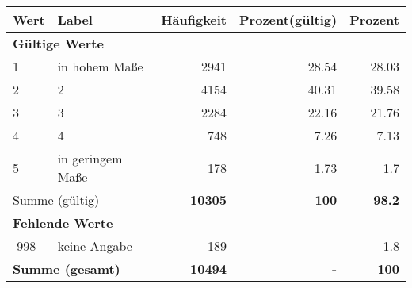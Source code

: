      \begin{longtable}{lXrrr}
     \toprule
     \textbf{Wert} & \textbf{Label} & \textbf{Häufigkeit} & \textbf{Prozent(gültig)} & \textbf{Prozent} \\
     \endhead
     \midrule
     \multicolumn{5}{l}{\textbf{Gültige Werte}}\\

     1 &
     \multicolumn{1}{X}{ in hohem Maße   } &


       \num{2941} &
       \num[round-mode=places,round-precision=2]{28.54} &
         \num[round-mode=places,round-precision=2]{28.03} \\

     2 &
     \multicolumn{1}{X}{ 2   } &


       \num{4154} &
       \num[round-mode=places,round-precision=2]{40.31} &
         \num[round-mode=places,round-precision=2]{39.58} \\

     3 &
     \multicolumn{1}{X}{ 3   } &


       \num{2284} &
       \num[round-mode=places,round-precision=2]{22.16} &
         \num[round-mode=places,round-precision=2]{21.76} \\

     4 &
     \multicolumn{1}{X}{ 4   } &


       \num{748} &
       \num[round-mode=places,round-precision=2]{7.26} &
         \num[round-mode=places,round-precision=2]{7.13} \\

     5 &
     \multicolumn{1}{X}{ in geringem Maße   } &


       \num{178} &
       \num[round-mode=places,round-precision=2]{1.73} &
         \num[round-mode=places,round-precision=2]{1.7} \\
     \midrule
     \multicolumn{2}{l}{Summe (gültig)} &
       \textbf{\num{10305}} &
     \textbf{\num{100}} &
       \textbf{\num[round-mode=places,round-precision=2]{98.2}} \\
     \multicolumn{5}{l}{\textbf{Fehlende Werte}}\\
       -998 &
       keine Angabe &
         \num{189} &
        - &
         \num[round-mode=places,round-precision=2]{1.8} \\
     \midrule
     \multicolumn{2}{l}{\textbf{Summe (gesamt)}} &
          \textbf{\num{10494}} &
        \textbf{-} &
        \textbf{\num{100}} \\
     \bottomrule
     \end{longtable}
     
